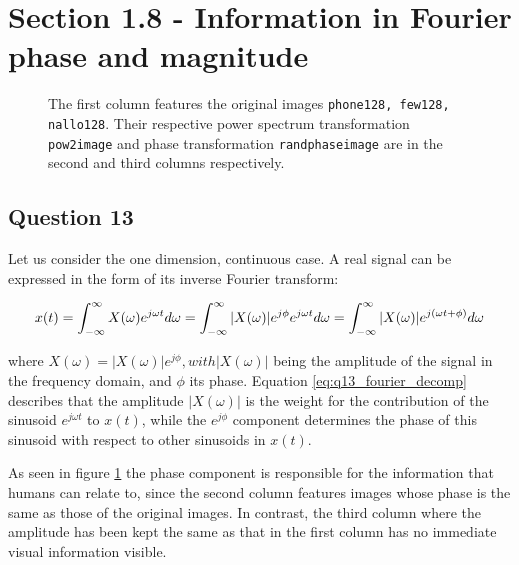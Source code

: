 \section{Section 1.8 - Information in Fourier phase and magnitude}

\begin{figure}[H]
	
	\caption{The first column features the original images \texttt{phone128, few128, nallo128}. Their respective power spectrum transformation
	\texttt{pow2image} and phase transformation \texttt{randphaseimage} are in the second and third columns respectively.}
	\label{fig:Q13}
\end{figure}


\subsection{Question 13}

Let us consider the one dimension, continuous case. A real signal can be expressed in the form of its inverse Fourier transform:

\begin{multline}
	x(t) = 	\int_{-\infty}^{\infty} X(\omega) e^{j\omega t} d \omega  = 
			\int_{-\infty}^{\infty} |X(\omega)| e^{j \phi} e^{j \omega t} d \omega = 
			\int_{-\infty}^{\infty} |X(\omega)| e^{j(\omega t + \phi)} d \omega
$$			
\label{eq:q13_fourier_decomp}
\end{multline}

where $X(\omega) = |X(\omega)| e^{j \phi}$$, with $$|X(\omega)|$ being the amplitude of the signal in the frequency domain, and $\phi$ its phase.
Equation \ref{eq:q13_fourier_decomp} describes that the amplitude $|X(\omega)|$ is the weight for the contribution of the sinusoid $e^{j\omega t}$ to $x(t)$,
while the $e^{j \phi}$ component determines the phase of this sinusoid with respect to other sinusoids in $x(t)$. 

As seen in figure \ref{fig:Q13} the phase component is responsible for the information that humans can relate to,
since the second column features images whose phase is the same as those of the original images. In contrast, the third column where the amplitude has been
kept the same as that in the first column has no immediate visual information visible.


